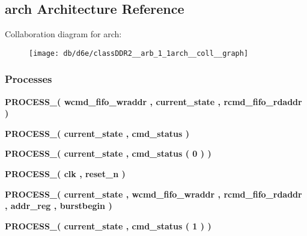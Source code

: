 \subsection{arch Architecture Reference}
\label{classDDR2__arb_1_1arch}


Collaboration diagram for arch\+:\nopagebreak
\begin{figure}[H]
\begin{center}
\leavevmode
\texttt{[image: db/d6e/classDDR2\_\_arb\_1\_1arch\_\_coll\_\_graph]}
\end{center}
\end{figure}
\subsubsection*{Processes}
 \begin{DoxyCompactItemize}
\item 
{\bf P\+R\+O\+C\+E\+S\+S\+\_}{\bfseries  ( {\bfseries {\bfseries {\bf wcmd\+\_\+fifo\+\_\+wraddr}} \textcolor{vhdlchar}{ }} , {\bfseries {\bfseries {\bf current\+\_\+state}} \textcolor{vhdlchar}{ }} , {\bfseries {\bfseries {\bf rcmd\+\_\+fifo\+\_\+rdaddr}} \textcolor{vhdlchar}{ }} )}
\item 
{\bf P\+R\+O\+C\+E\+S\+S\+\_}{\bfseries  ( {\bfseries {\bfseries {\bf current\+\_\+state}} \textcolor{vhdlchar}{ }} , {\bfseries {\bfseries {\bf cmd\+\_\+status}} \textcolor{vhdlchar}{ }} )}
\item 
{\bf P\+R\+O\+C\+E\+S\+S\+\_}{\bfseries  ( {\bfseries {\bfseries {\bf current\+\_\+state}} \textcolor{vhdlchar}{ }} , {\bfseries {\bfseries {\bf cmd\+\_\+status}} \textcolor{vhdlchar}{(}\textcolor{vhdlchar}{ } \textcolor{vhdldigit}{0} \textcolor{vhdlchar}{)}\textcolor{vhdlchar}{ }} )}
\item 
{\bf P\+R\+O\+C\+E\+S\+S\+\_}{\bfseries  ( {\bfseries {\bfseries {\bf clk}} \textcolor{vhdlchar}{ }} , {\bfseries {\bfseries {\bf reset\+\_\+n}} \textcolor{vhdlchar}{ }} )}
\item 
{\bf P\+R\+O\+C\+E\+S\+S\+\_}{\bfseries  ( {\bfseries {\bfseries {\bf current\+\_\+state}} \textcolor{vhdlchar}{ }} , {\bfseries {\bfseries {\bf wcmd\+\_\+fifo\+\_\+wraddr}} \textcolor{vhdlchar}{ }} , {\bfseries {\bfseries {\bf rcmd\+\_\+fifo\+\_\+rdaddr}} \textcolor{vhdlchar}{ }} , {\bfseries {\bfseries {\bf addr\+\_\+reg}} \textcolor{vhdlchar}{ }} , {\bfseries {\bfseries {\bf burstbegin}} \textcolor{vhdlchar}{ }} )}
\item 
{\bf P\+R\+O\+C\+E\+S\+S\+\_}{\bfseries  ( {\bfseries {\bfseries {\bf current\+\_\+state}} \textcolor{vhdlchar}{ }} , {\bfseries {\bfseries {\bf cmd\+\_\+status}} \textcolor{vhdlchar}{(}\textcolor{vhdlchar}{ } \textcolor{vhdldigit}{1} \textcolor{vhdlchar}{)}\textcolor{vhdlchar}{ }} )}

\end{DoxyCompactItemize}
